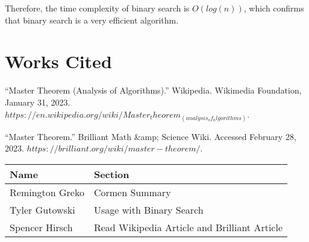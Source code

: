 \documentclass{article}
\begin{document}
\bigskip

\noindent Therefore, the time complexity of binary search is \textit{$O(log(n))$}, which confirms that binary search is a very efficient algorithm.

\pagebreak
\section{Works Cited}

``Master Theorem (Analysis of Algorithms).'' Wikipedia. Wikimedia Foundation, January 31, 2023. $https://en.wikipedia.org/wiki/Master_theorem_(analysis_of_algorithms)$.

``Master Theorem.'' Brilliant Math \&amp; Science Wiki. Accessed February 28, 2023. $https://brilliant.org/wiki/master-theorem/$. 

\pagebreak

\begin{center}
        \begin{tabular}{|p{3cm}|p{6cm}|}
            \hline
            \textbf{Name} & \textbf{Section} \\
            \hline
            Remington Greko & Cormen Summary \\
            \hline
            Tyler Gutowski & Usage with Binary Search \\
            \hline
            Spencer Hirsch & Read Wikipedia Article and Brilliant Article \\
            \hline
        \end{tabular}
    \end{center}
\end{document}
